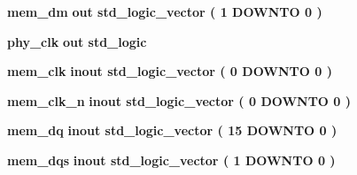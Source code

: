 \begin{DoxyCompactItemize}
\item 
{\bf mem\+\_\+dm}  {\bfseries {\bfseries \textcolor{keywordflow}{out}\textcolor{vhdlchar}{ }}} {\bfseries \textcolor{comment}{std\+\_\+logic\+\_\+vector}\textcolor{vhdlchar}{ }\textcolor{vhdlchar}{(}\textcolor{vhdlchar}{ }\textcolor{vhdlchar}{ } \textcolor{vhdldigit}{1} \textcolor{vhdlchar}{ }\textcolor{keywordflow}{D\+O\+W\+N\+TO}\textcolor{vhdlchar}{ }\textcolor{vhdlchar}{ } \textcolor{vhdldigit}{0} \textcolor{vhdlchar}{ }\textcolor{vhdlchar}{)}\textcolor{vhdlchar}{ }} 
\item 
{\bf phy\+\_\+clk}  {\bfseries {\bfseries \textcolor{keywordflow}{out}\textcolor{vhdlchar}{ }}} {\bfseries \textcolor{comment}{std\+\_\+logic}\textcolor{vhdlchar}{ }} 
\item 
{\bf mem\+\_\+clk}  {\bfseries {\bfseries \textcolor{keywordflow}{inout}\textcolor{vhdlchar}{ }}} {\bfseries \textcolor{comment}{std\+\_\+logic\+\_\+vector}\textcolor{vhdlchar}{ }\textcolor{vhdlchar}{(}\textcolor{vhdlchar}{ }\textcolor{vhdlchar}{ } \textcolor{vhdldigit}{0} \textcolor{vhdlchar}{ }\textcolor{keywordflow}{D\+O\+W\+N\+TO}\textcolor{vhdlchar}{ }\textcolor{vhdlchar}{ } \textcolor{vhdldigit}{0} \textcolor{vhdlchar}{ }\textcolor{vhdlchar}{)}\textcolor{vhdlchar}{ }} 
\item 
{\bf mem\+\_\+clk\+\_\+n}  {\bfseries {\bfseries \textcolor{keywordflow}{inout}\textcolor{vhdlchar}{ }}} {\bfseries \textcolor{comment}{std\+\_\+logic\+\_\+vector}\textcolor{vhdlchar}{ }\textcolor{vhdlchar}{(}\textcolor{vhdlchar}{ }\textcolor{vhdlchar}{ } \textcolor{vhdldigit}{0} \textcolor{vhdlchar}{ }\textcolor{keywordflow}{D\+O\+W\+N\+TO}\textcolor{vhdlchar}{ }\textcolor{vhdlchar}{ } \textcolor{vhdldigit}{0} \textcolor{vhdlchar}{ }\textcolor{vhdlchar}{)}\textcolor{vhdlchar}{ }} 
\item 
{\bf mem\+\_\+dq}  {\bfseries {\bfseries \textcolor{keywordflow}{inout}\textcolor{vhdlchar}{ }}} {\bfseries \textcolor{comment}{std\+\_\+logic\+\_\+vector}\textcolor{vhdlchar}{ }\textcolor{vhdlchar}{(}\textcolor{vhdlchar}{ }\textcolor{vhdlchar}{ } \textcolor{vhdldigit}{15} \textcolor{vhdlchar}{ }\textcolor{keywordflow}{D\+O\+W\+N\+TO}\textcolor{vhdlchar}{ }\textcolor{vhdlchar}{ } \textcolor{vhdldigit}{0} \textcolor{vhdlchar}{ }\textcolor{vhdlchar}{)}\textcolor{vhdlchar}{ }} 
\item 
{\bf mem\+\_\+dqs}  {\bfseries {\bfseries \textcolor{keywordflow}{inout}\textcolor{vhdlchar}{ }}} {\bfseries \textcolor{comment}{std\+\_\+logic\+\_\+vector}\textcolor{vhdlchar}{ }\textcolor{vhdlchar}{(}\textcolor{vhdlchar}{ }\textcolor{vhdlchar}{ } \textcolor{vhdldigit}{1} \textcolor{vhdlchar}{ }\textcolor{keywordflow}{D\+O\+W\+N\+TO}\textcolor{vhdlchar}{ }\textcolor{vhdlchar}{ } \textcolor{vhdldigit}{0} \textcolor{vhdlchar}{ }\textcolor{vhdlchar}{)}\textcolor{vhdlchar}{ }} 

\end{DoxyCompactItemize}
